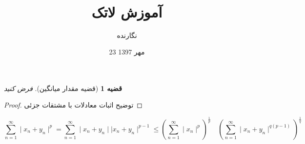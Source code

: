 \documentclass{article}
\title{آموزش لاتک}
\author{نگارنده}
\date{23 مهر 1397}
\newtheorem{thm}{قضیه}
\newcommand{\pde}{معادلات با مشتقات جزئی}
\begin{document}
	\maketitle

	\begin{thm}[قضیه مقدار میانگین]
		فرض کنید
	\end{thm}
	\begin{proof}
		توضیح اثبات
		\pde
	\end{proof}
\[
\sum_{n=1}^{\infty}\mid x_{n}+y_{n}\mid ^{p} = \sum_{n=1}^{\infty}\mid x_{n}+y_{n}\mid \mid x_{n}+y_{n}\mid ^{p-1}
\leq \left( \sum_{n=1}^{\infty}\mid x_{n}\mid ^{p} \right) ^\frac{1}{p}
\quad 
\left(\sum_{n=1}^{\infty}\mid x_{n} + y_{n}\mid ^{q(p-1)}\right) ^\frac{1}{q}
\]
\end{document}
